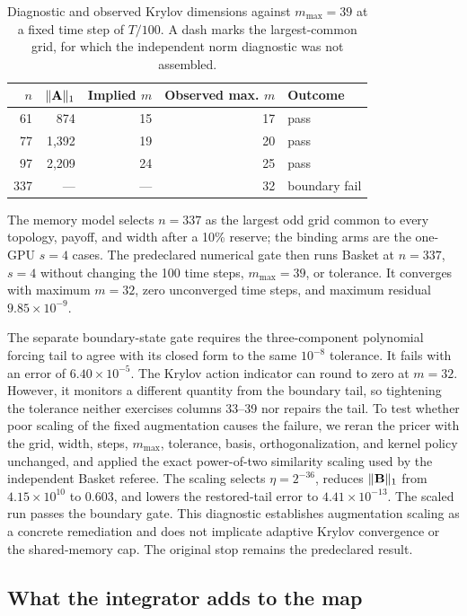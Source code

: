 \begin{table}[htbp!]
\centering
\caption{Diagnostic and observed Krylov dimensions against $m_{\max}=39$ at a fixed time step of $T/100$. A dash marks the largest-common grid, for which the independent norm diagnostic was not assembled.}
\label{tab:ca-stiffness}
\begin{tabular}{@{}rrrrl@{}}
\toprule
$n$ & $\lVert \mathbf{A} \rVert_1$ & \textbf{Implied} $m$ & \textbf{Observed max.} $m$ & \textbf{Outcome} \\
\midrule
61  & 874      & 15 & 17 & pass \\
77  & 1{,}392  & 19 & 20 & pass \\
97  & 2{,}209  & 24 & 25 & pass \\
337 & ---      & --- & 32 & boundary fail \\
\bottomrule
\end{tabular}
\end{table}

The memory model selects $n=337$ as the largest odd grid common to every topology, payoff, and width after a 10\% reserve; the binding arms are the one-GPU $s=4$ cases. The predeclared numerical gate then runs Basket at $n=337$, $s=4$ without changing the 100 time steps, $m_{\max}=39$, or tolerance. It converges with maximum $m=32$, zero unconverged time steps, and maximum residual $9.85\times10^{-9}$.

The separate boundary-state gate requires the three-component polynomial forcing tail to agree with its closed form to the same $10^{-8}$ tolerance. It fails with an error of $6.40\times10^{-5}$. The Krylov action indicator can round to zero at $m=32$. However, it monitors a different quantity from the boundary tail, so tightening the tolerance neither exercises columns 33--39 nor repairs the tail. To test whether poor scaling of the fixed augmentation causes the failure, we reran the pricer with the grid, width, steps, $m_{\max}$, tolerance, basis, orthogonalization, and kernel policy unchanged, and applied the exact power-of-two similarity scaling used by the independent Basket referee. The scaling selects $\eta=2^{-36}$, reduces $\lVert\mathbf{B}\rVert_1$ from $4.15\times10^{10}$ to $0.603$, and lowers the restored-tail error to $4.41\times10^{-13}$. The scaled run passes the boundary gate. This diagnostic establishes augmentation scaling as a concrete remediation and does not implicate adaptive Krylov convergence or the shared-memory cap. The original stop remains the predeclared result.

\subsection{What the integrator adds to the map}\label{sec:integrator-synthesis}

